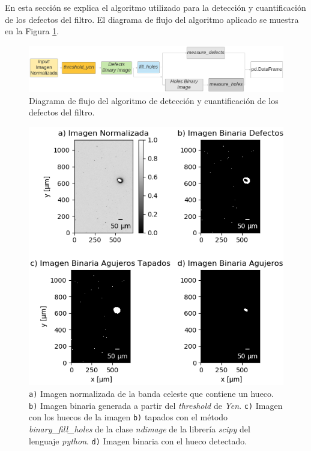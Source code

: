 \hspace{0.5cm}En esta sección se explica el algoritmo utilizado para la detección y cuantificación de los defectos del filtro. El diagrama de flujo del algoritmo aplicado se muestra en la Figura \ref{fig:diagflujoalgor}. 

\begin{figure}[H]
\centering
\includegraphics[width=1.0\textwidth]{Figs/cuantificaciondefectos/diag_flujoalgor.png}
\caption{Diagrama de flujo del algoritmo de detección y cuantificación de los defectos del filtro.}
\label{fig:diagflujoalgor}
\end{figure}


\begin{figure}[H]
\centering
\includegraphics[scale=1.1]{Figs/defectosZEISS/algor_defecs.png}
\caption{\texttt{a)} Imagen normalizada de la banda celeste que contiene un hueco.  \texttt{b)} Imagen binaria generada a partir del \textit{threshold} de \textit{Yen}. \texttt{c)} Imagen con los huecos de la imagen \texttt{b)} tapados con el método \textit{binary\_fill\_holes} de la clase \textit{ndimage} de la librería \textit{scipy} del lenguaje \textit{python}. \texttt{d)} Imagen binaria con el hueco detectado.}
\label{fig:flujoalgo}
\end{figure} 


